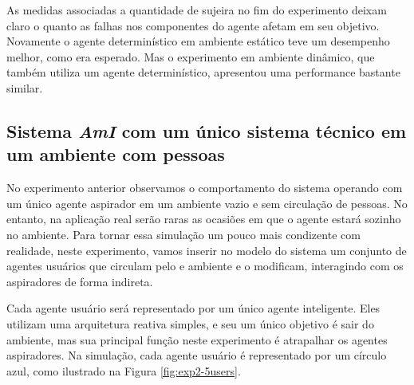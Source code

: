 \begin{figure}[h!]
    \centering
\end{figure}

As medidas associadas a quantidade de sujeira no fim do experimento deixam claro o quanto as falhas nos componentes do agente afetam em seu objetivo. Novamente o agente determinístico em ambiente estático teve um desempenho melhor, como era esperado. Mas o experimento em ambiente dinâmico, que também utiliza um agente determinístico, apresentou uma performance bastante similar. 

\subsection{Sistema \textit{AmI} com um único sistema técnico em um ambiente com pessoas}
\label{sec:exp-user}
No experimento anterior observamos o comportamento do sistema operando com um único agente aspirador em um ambiente vazio e sem circulação de pessoas. No entanto, na aplicação real serão raras as ocasiões em que o agente estará sozinho no ambiente. Para tornar essa simulação um pouco mais condizente com realidade, neste experimento, vamos inserir no modelo do sistema um conjunto de agentes usuários que circulam pelo e ambiente e o modificam, interagindo com os aspiradores de forma indireta.

Cada agente usuário será representado por um único agente inteligente. Eles utilizam uma arquitetura reativa simples, e seu um único objetivo é sair do ambiente, mas sua principal função neste experimento é atrapalhar os agentes aspiradores. Na simulação, cada agente usuário é representado por um círculo azul, como ilustrado na Figura \ref{fig:exp2-5users}. 

